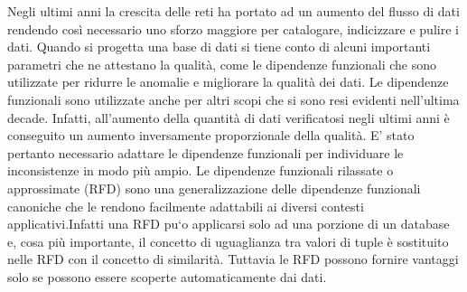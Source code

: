 Negli ultimi anni la crescita delle reti ha portato ad un aumento del flusso di dati rendendo così necessario uno sforzo maggiore per catalogare, indicizzare e pulire i dati. Quando si progetta una base di dati si tiene conto di alcuni importanti parametri che ne attestano la qualità, come le dipendenze
funzionali che sono utilizzate per ridurre le anomalie e migliorare la qualità dei dati. Le dipendenze funzionali sono utilizzate anche per altri scopi che si sono resi evidenti nell’ultima decade. Infatti, all’aumento della quantità di dati verificatosi negli ultimi anni è conseguito un aumento inversamente proporzionale della qualità. E’ stato pertanto necessario adattare le dipendenze funzionali per individuare le inconsistenze in modo più ampio. Le dipendenze funzionali rilassate o approssimate (RFD) sono una generalizzazione delle dipendenze funzionali canoniche che le rendono facilmente adattabili ai diversi contesti applicativi.Infatti una RFD pu`o applicarsi solo ad una porzione di un database e, cosa più importante, il concetto di uguaglianza tra valori di tuple è sostituito nelle RFD con il concetto di similarità. Tuttavia le RFD possono fornire vantaggi solo se possono essere scoperte automaticamente dai dati.